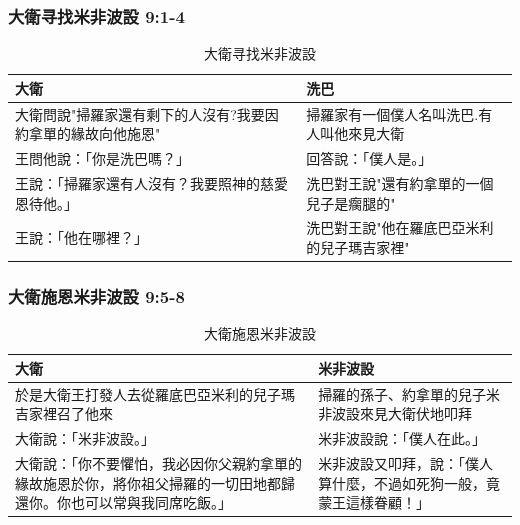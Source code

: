 \subsubsection{大衛寻找米非波設 9:1-4}
\begin{table}[H]
\centering 
\begin{tabular}{p{10.5cm}|p{7.35cm}}\hline\hline
大衛&洗巴\\\hline
大衛問說"掃羅家還有剩下的人沒有?我要因約拿單的緣故向他施恩" &掃羅家有一個僕人名叫洗巴.有人叫他來見大衛\\\hline
王問他說：「你是洗巴嗎？」&回答說：「僕人是。」\\\hline
王說：「掃羅家還有人沒有？我要照神的慈愛恩待他。」&洗巴對王說"還有約拿單的一個兒子是瘸腿的" \\\hline
王說：「他在哪裡？」&洗巴對王說"他在羅底巴亞米利的兒子瑪吉家裡" \\\hline
\end{tabular}
\caption{大衛寻找米非波設}
\end{table}


\subsubsection{大衛施恩米非波設 9:5-8}
\begin{table}[H]
\hspace*{-7mm}
\centering 
\begin{tabular}{p{9.75cm}|p{8.5cm}}\hline\hline
大衛&米非波設\\\hline
於是大衛王打發人去從羅底巴亞米利的兒子瑪吉家裡召了他來&掃羅的孫子、約拿單的兒子米非波設來見大衛伏地叩拜\\\hline
大衛說：「米非波設。」&米非波設說：「僕人在此。」 \\\hline
大衛說：「你不要懼怕，我必因你父親約拿單的緣故施恩於你，將你祖父掃羅的一切田地都歸還你。你也可以常與我同席吃飯。」&米非波設又叩拜，說：「僕人算什麼，不過如死狗一般，竟蒙王這樣眷顧！」 \\\hline
\end{tabular}
\caption{大衛施恩米非波設}
\end{table}

